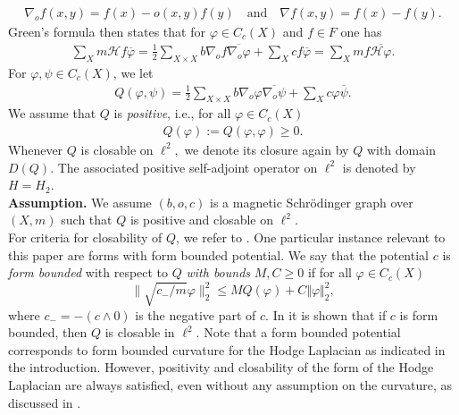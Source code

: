 \documentclass[10pt]{amsart}
\theoremstyle{definition}
\begin{document}
\begin{align*}
    \nabla_{o}f (x,y) = f(x)-o(x,y)f(y)\quad\mbox{and}\quad \nabla f (x,y) = f(x)-f(y).
\end{align*}
Green's formula \cite[Lemma 2.1.]{GKS} then states that for $\varphi  \in C_c(X)$ and $f\in F$ one has
\begin{align*}
    \sum_X m\mathcal{H}f \overline{\varphi}= \frac{1}{2}\sum_{X\times X}b \nabla_o f\overline{\nabla_o \varphi }  + \sum_{ X}c  f \overline{\varphi }=\sum_X mf \overline{\mathcal{H}\varphi} .
\end{align*}
For $\varphi,\psi\in C_c(X)$, we let
\begin{align*}
    Q(\varphi,\psi) = \frac{1}{2}\sum_{X\times X}b \nabla_o \varphi\overline{\nabla_o \psi }  + \sum_{ X}c \varphi \overline{\psi }.
\end{align*}
We assume that $Q$ is \emph{positive}, i.e.,  for all $\varphi\in C_c(X)$
\begin{align*}
    Q(\varphi) := Q(\varphi,\varphi) \geq 0.
\end{align*}
Whenever $Q$ is closable on $\ell^2,$ we denote its closure again by $Q$ with domain $D(Q).$ The associated positive self-adjoint operator on $\ell^2$ is denoted by $H=H_2.$ \\

{\bf Assumption.} We assume $(b,o,c)$ is a magnetic Schrödinger graph over $(X,m)$ such that $Q$ is positive and closable on $\ell^2$.\\

For criteria for closability of $Q$, we refer to \cite{GKS}. One particular instance relevant to this paper are forms with form bounded potential. We say that the potential $c$ is \textit{form bounded} with respect to $Q$ \emph{with bounds} $M,C\geq 0$ if for all $\varphi\in C_c(X)$ 
\begin{equation*}\label{formbounded}
     \| \sqrt{c_-/m}\varphi\|_2^2\leq M Q(\varphi)+C\Vert\varphi\Vert^2_2,
 \end{equation*}
where $c_- = -(c\wedge 0)$ is the negative part of $c.$ In \cite[Proposition 2.8.]{GKS} it is shown that if $c$ is form bounded, then $Q$ is   closable in $\ell^2 $. Note that a form bounded potential corresponds to form bounded curvature for the Hodge Laplacian as indicated in the introduction.  However, positivity and closability of the form of the Hodge Laplacian are always satisfied, even without any assumption on the curvature, as discussed in \cite{BK}.
\end{document}
